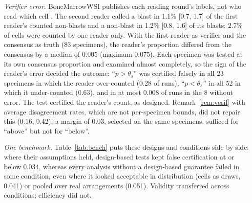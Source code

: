 \documentclass[journal]{IEEEtran}
\begin{document}
\emph{Verifier error.} BoneMarrowWSI publishes each reading round's labels, not who read which cell \cite{hofener2025bmwsi}. The second reader called a blast in 1.1\% [0.7, 1.7] of the first reader's counted non-blasts and a non-blast in 1.2\% [0.8, 1.6] of its blasts; 2.7\% of cells were counted by one reader only. With the first reader as verifier and the consensus as truth (83 specimens), the reader's proportion differed from the consensus by a median of 0.005 (maximum 0.075). Each specimen was tested at its own consensus proportion and examined almost completely, so the sign of the reader's error decided the outcome: ``$p>\theta_s$'' was certified falsely in all 23 specimens in which the reader over-counted (0.28 of runs), ``$p<\theta_s$'' in all 52 in which it under-counted (0.63), and in at most 0.008 of runs in the 8 without error. The test certified the reader's count, as designed. Remark~\ref{rem:verif} with average disagreement rates, which are not per-specimen bounds, did not repair this (0.16, 0.42); a margin of 0.03, selected on the same specimens, sufficed for ``above'' but not for ``below''.

\emph{One benchmark.} Table~\ref{tab:bench} puts these designs and conditions side by side: where their assumptions held, design-based tests kept false certification at or below 0.034, whereas every analysis without a design-based guarantee failed in some condition, even where it looked acceptable in distribution (cells as draws, 0.041) or pooled over real arrangements (0.051). Validity transferred across conditions; efficiency did not.
\end{document}
